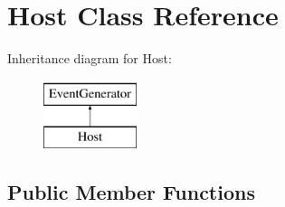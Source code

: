 \hypertarget{classHost}{\section{\-Host \-Class \-Reference}
\label{classHost}
}
\-Inheritance diagram for \-Host\-:\begin{figure}[H]
\begin{center}
\leavevmode
\includegraphics[height=2.000000cm]{classHost}
\end{center}
\end{figure}
\subsection*{\-Public \-Member \-Functions}

